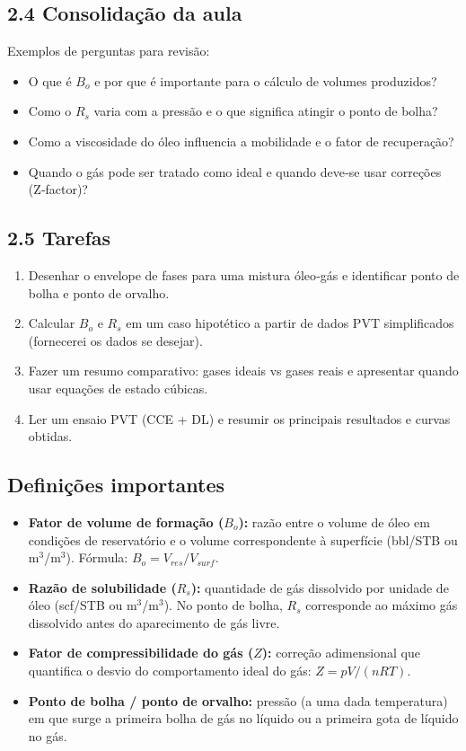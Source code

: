 \documentclass[11pt,a4paper]{article}
\begin{document}
\subsection{2.4 Consolidação da aula}
Exemplos de perguntas para revisão:
\begin{itemize}
\item O que é $B_o$ e por que é importante para o cálculo de volumes produzidos?
\item Como o $R_s$ varia com a pressão e o que significa atingir o ponto de bolha?
\item Como a viscosidade do óleo influencia a mobilidade e o fator de recuperação?
\item Quando o gás pode ser tratado como ideal e quando deve‑se usar correções (Z‑factor)?
\end{itemize}

\subsection{2.5 Tarefas}
\begin{enumerate}
\item Desenhar o envelope de fases para uma mistura óleo‑gás e identificar ponto de bolha e ponto de orvalho.
\item Calcular $B_o$ e $R_s$ em um caso hipotético a partir de dados PVT simplificados (fornecerei os dados se desejar).
\item Fazer um resumo comparativo: gases ideais vs gases reais e apresentar quando usar equações de estado cúbicas.
\item Ler um ensaio PVT (CCE + DL) e resumir os principais resultados e curvas obtidas.
\end{enumerate}

\subsection{Definições importantes}
\begin{itemize}
\item \textbf{Fator de volume de formação ($B_o$):} razão entre o volume de óleo em condições de reservatório e o volume correspondente à superfície (bbl/STB ou m$^3$/m$^3$). Fórmula: $B_o = V_{res}/V_{surf}$.
\item \textbf{Razão de solubilidade ($R_s$):} quantidade de gás dissolvido por unidade de óleo (scf/STB ou m$^3$/m$^3$). No ponto de bolha, $R_s$ corresponde ao máximo gás dissolvido antes do aparecimento de gás livre.
\item \textbf{Fator de compressibilidade do gás ($Z$):} correção adimensional que quantifica o desvio do comportamento ideal do gás: $Z = pV/(nRT)$.
\item \textbf{Ponto de bolha / ponto de orvalho:} pressão (a uma dada temperatura) em que surge a primeira bolha de gás no líquido ou a primeira gota de líquido no gás.
\end{itemize}
\end{document}
